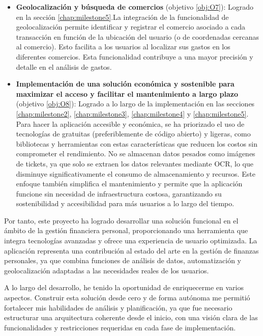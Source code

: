 \begin{itemize}
    \item \textbf{Geolocalización y búsqueda de comercios} (objetivo \ref{obj:O7}): Logrado en la sección \ref{chap:milestone5}.La integración de la funcionalidad de geolocalización permite identificar y registrar el comercio asociado a cada transacción en función de la ubicación del usuario (o de coordenadas cercanas al comercio). Esto facilita a los usuarios al localizar sus gastos en los diferentes comercios. Esta funcionalidad contribuye a una mayor precisión y detalle en el análisis de gastos.
    
    \item \textbf{Implementación de una solución económica y sostenible para maximizar el acceso y facilitar el mantenimiento a largo plazo} (objetivo \ref{obj:O8}): Logrado a lo largo de la implementación en las secciones \ref{chap:milestone2}, \ref{chap:milestone3}, \ref{chap:milestone4} y \ref{chap:milestone5}. Para hacer la aplicación accesible y económica, se ha priorizado el uso de tecnologías de gratuitas (preferiblemente de código abierto) y ligeras, como bibliotecas y herramientas con estas características que reducen los costos sin comprometer el rendimiento. No se almacenan datos pesados como imágenes de tickets, ya que solo se extraen los datos relevantes mediante OCR, lo que disminuye significativamente el consumo de almacenamiento y recursos. Este enfoque también simplifica el mantenimiento y permite que la aplicación funcione sin necesidad de infraestructura costosa, garantizando su sostenibilidad y accesibilidad para más usuarios a lo largo del tiempo.

\end{itemize}

Por tanto, este proyecto ha logrado desarrollar una solución funcional en el ámbito de la gestión financiera personal, proporcionando una herramienta que integra tecnologías avanzadas y ofrece una experiencia de usuario optimizada. La aplicación representa una contribución al estado del arte en la gestión de finanzas personales, ya que combina funciones de análisis de datos, automatización y geolocalización adaptadas a las necesidades reales de los usuarios.

A lo largo del desarrollo, he tenido la oportunidad de enriquecerme en varios aspectos. Construir esta solución desde cero y de forma autónoma me permitió fortalecer mis habilidades de análisis y planificación, ya que fue necesario estructurar una arquitectura coherente desde el inicio, con una visión clara de las funcionalidades y restricciones requeridas en cada fase de implementación.

